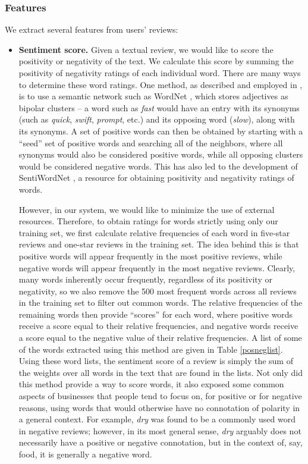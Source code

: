 \subsubsection{Features}
We extract several features from users' reviews:
\begin{itemize}
\item {\bf Sentiment score.} Given a textual review, we would like to score the positivity or negativity of the text. We calculate this score by summing the positivity of negativity ratings of each individual word. There are many ways to determine these word ratings. One method, as described and employed in \cite{hu-liu}, is to use a semantic network such as WordNet \cite{wordnet}, which stores adjectives as bipolar clusters -- a word such as \emph{fast} would have an entry with its synonyms (such as \emph{quick}, \emph{swift}, \emph{prompt}, etc.) and its opposing word (\emph{slow}), along with its synonyms. A set of positive words can then be obtained by starting with a ``seed'' set of positive words and searching all of the neighbors, where all synonyms would also be considered positive words, while all opposing clusters would be considered negative words. This has also led to the development of SentiWordNet \cite{sentiwordnet}, a resource for obtaining positivity and negativity ratings of words.

However, in our system, we would like to minimize the use of external resources. Therefore, to obtain ratings for words strictly using only our training set, we first calculate relative frequencies of each word in five-star reviews and one-star reviews in the training set. The idea behind this is that positive words will appear frequently in the most positive reviews, while negative words will appear frequently in the most negative reviews. Clearly, many words inherently occur frequently, regardless of its positivity or negativity, so we also remove the 500 most frequent words across all reviews in the training set to filter out common words. The relative frequencies of the remaining words then provide ``scores'' for each word, where positive words receive a score equal to their relative frequencies, and negative words receive a score equal to the negative value of their relative frequencies. A list of some of the words extracted using this method are given in Table \ref{posneglist}. Using these word lists, the sentiment score of a review is simply the sum of the weights over all words in the text that are found in the lists. Not only did this method provide a way to score words, it also exposed some common aspects of businesses that people tend to focus on, for positive or for negative reasons, using words that would otherwise have no connotation of polarity in a general context. For example, \emph{dry} was found to be a commonly used word in negative reviews; however, in its most general sense, \emph{dry} arguably does not necessarily have a positive or negative connotation, but in the context of, say, food, it is generally a negative word.


\end{itemize}
